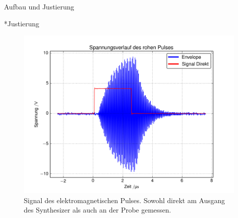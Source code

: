 \documentclass[pdftex, a4paper,11pt, twoside, ngerman]{report}
\begin{document}
  
  
  
  \begin{chapter}{Aufbau und Justierung}
    \label{chpAufbau}
    
    
    
    \begin{section}*{Justierung}
      \label{chpAufbauJustierung}
      
      \begin{figure}[htb]
        \centering
        \includegraphics[width=\textwidth]{Figures/RohPuls1.png}
        \caption{Signal des elektromagnetischen Pulses.
          Sowohl direkt am Ausgang des Synthesizer als auch an der Probe
          gemessen.}
        \label{figRohPuls}
      \end{figure}


      
    \end{section}
    
  \end{chapter}
  
  
  
\end{document}
